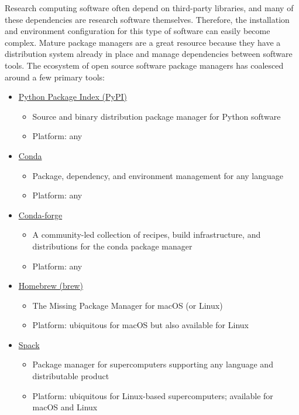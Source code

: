 \documentclass[]{nrel}
\begin{document}
Research computing software often depend on third-party libraries, and many of these dependencies
are research software themselves. Therefore, the installation and environment configuration
for this type of software can easily become complex.
Mature package managers are a great resource because they have a distribution system already in place
and manage dependencies between software tools.
The ecosystem of open source software package managers has coalesced around a few primary tools:
\begin{itemize}

\item \href{https://pypi.org}{Python Package Index (PyPI)}
\begin{itemize}
\item Source and binary distribution package manager for Python software
\item Platform: any
\end{itemize}

\item \href{https://docs.conda.io/en/latest/}{Conda}
\begin{itemize}
\item Package, dependency, and environment management for any language
\item Platform: any
\end{itemize}

\item \href{https://conda-forge.org}{Conda-forge}
\begin{itemize}
\item A community-led collection of recipes, build infrastructure, and distributions for the conda package manager
\item Platform: any
\end{itemize}

\item \href{https://brew.sh}{Homebrew (brew)}
\begin{itemize}
\item The Missing Package Manager for macOS (or Linux)
\item Platform: ubiquitous for macOS but also available for Linux
\end{itemize}

\item \href{https://spack.io}{Spack}
\begin{itemize}
\item Package manager for supercomputers supporting any language and distributable product
\item Platform: ubiquitous for Linux-based supercomputers;  available for macOS and Linux
\end{itemize}


\end{itemize}
\end{document}
